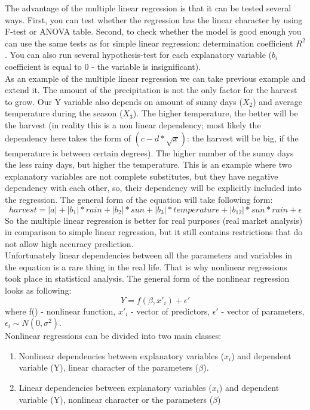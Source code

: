 \documentclass {article}
\begin{document}
The advantage of the multiple linear regression is that it can be tested several ways. First, you can test whether the regression has the linear character by using F-test or ANOVA table. Second, to check whether the model is good enough you can use the same tests as for simple linear regression: determination coefficient $R^2$. You can also run several hypothesis-test for each explanatory variable ($b_{i}$ coefficient is equal to 0 - the variable is insignificant).\\
As an example of the multiple linear regression we can take previous example and extend it. The amount of the precipitation is not the only factor for the harvest to grow. Our Y variable also depends on amount of sunny days ($X_{2}$) and average temperature during the season ($X_{3}$). The higher temperature, the better will be the harvest (in reality this is a non linear dependency; most likely the dependency here takes the form of $(c-d*\sqrt{x})$: the harvest will be big, if the temperature is between certain degrees). The higher number of the sunny days the less rainy days, but higher the temperature. This is an example where two explanatory variables are not complete substitutes, but they have negative dependency with each other, so, their dependency will be explicitly included into the regression. The general form of the equation will take following form:
\[harvest = |a| + |b_{1}|*rain + |b_{2}|*sun + |b_{3}|*temperature + |b_{12}|*sun*rain + \epsilon\]
So the multiple linear regression is better for real purposes (real market analysis) in comparison to simple linear regression, but it still contains restrictions that do not allow high accuracy prediction.\\
Unfortunately linear dependencies between all the parameters and variables in the equation is a rare thing in the real life. That is why nonlinear regressions took place in statistical analysis. The general form of the nonlinear regression looks as following:
\[Y = f(\beta, x'_{i}) + \epsilon'\]
where f() - nonlinear function, $x'_{i}$ - vector of predictors, $\epsilon'$ - vector of parameters, $\epsilon_{i} \sim N(0, \sigma^2)$.\\
Nonlinear regressions can be divided into two main classes:
\begin{enumerate}
	\item Nonlinear dependencies between explanatory variables ($x_{i}$) and dependent variable (Y), linear character of the parameters ($\beta$).
	\item Linear dependencies between explanatory variables ($x_{i}$) and dependent variable (Y), nonlinear character or the parameters ($\beta$) 
\end{enumerate} 
\end{document}

